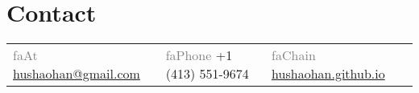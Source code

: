 
\section{\sc Contact}
\newcommand{\seticon}[1]{\textcolor{gray}{\csname #1\endcsname}}
\vspace{.01in}
\begin{tabular}{@{}p{2.11in}p{2.11in}p{2.11in}}
\seticon{faAt} {\href{mailto:hushaohan@gmail.com}{hushaohan@gmail.com}}  &
\seticon{faPhone} +1 (413) 551-9674  &
\seticon{faChain} {\href{https://hushaohan.github.io}{hushaohan.github.io}}
\end{tabular}
